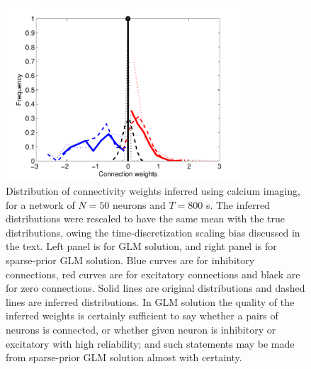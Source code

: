 \begin{figure}[h]
	\centering
\includegraphics[width=250pt]{../figs/Figure5_hist_glm_vanilla}
\caption{Distribution of connectivity weights inferred using calcium imaging, for a network of $N=50$ neurons and $T=800$ s. The inferred distributions were rescaled to have the same mean with the true distributions, owing the time-discretization scaling bias discussed in the text. Left panel is for GLM solution, and right panel is for sparse-prior GLM solution. Blue curves are for inhibitory connections, red curves are for excitatory connections and black are for zero connections. Solid lines are original distributions and dashed lines are inferred distributions. In GLM solution the quality of the inferred weights is certainly sufficient to say whether a pairs of neurons is connected, or whether given neuron is inhibitory or excitatory with high reliability; and such statements may be made from sparse-prior GLM solution almost with certainty.}
\label{fig:distr}
\end{figure}


